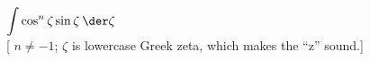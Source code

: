 $\displaystyle \int \cos^n \zeta \sin \zeta\:\der \zeta$\\
{[} $n\ne -1$; $\zeta$ is lowercase Greek zeta, which makes the ``z'' sound.{]}
\answercheck

